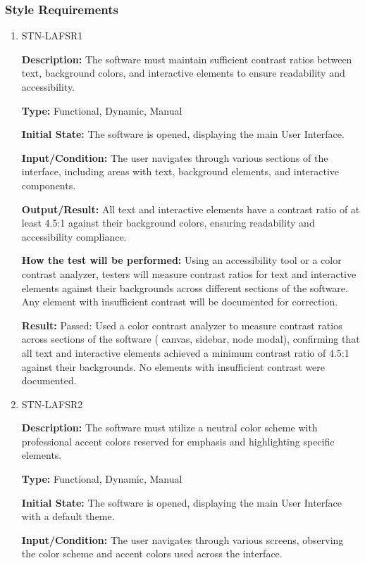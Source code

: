 \documentclass[12pt, titlepage]{article}
\begin{document}
\subsubsection{Style Requirements}
\begin{enumerate}
\item{STN-LAFSR1\\}

\textbf{Description:} The software must maintain sufficient contrast ratios between text, background colors, and interactive elements to ensure readability and accessibility.

\textbf{Type:} Functional, Dynamic, Manual

\textbf{Initial State:} The software is opened, displaying the main User Interface.

\textbf{Input/Condition:} The user navigates through various sections of the interface, including areas with text, background elements, and interactive components.

\textbf{Output/Result:} All text and interactive elements have a contrast ratio of at least 4.5:1 against their background colors, ensuring readability and accessibility compliance.

\textbf{How the test will be performed:} Using an accessibility tool or a color contrast analyzer, testers will measure contrast ratios for text and interactive elements against their backgrounds across different sections of the software. Any element with insufficient contrast will be documented for correction.

\textbf{Result:} Passed: Used a color contrast analyzer to measure contrast ratios across sections of the software ( canvas, sidebar, node modal), confirming that all text and interactive elements achieved a minimum contrast ratio of 4.5:1 against their backgrounds. No elements with insufficient contrast were documented.

\item{STN-LAFSR2\\}

\textbf{Description:} The software must utilize a neutral color scheme with professional accent colors reserved for emphasis and highlighting specific elements.

\textbf{Type:} Functional, Dynamic, Manual

\textbf{Initial State:} The software is opened, displaying the main User Interface with a default theme.

\textbf{Input/Condition:} The user navigates through various screens, observing the color scheme and accent colors used across the interface.


\end{enumerate}
\end{document}
